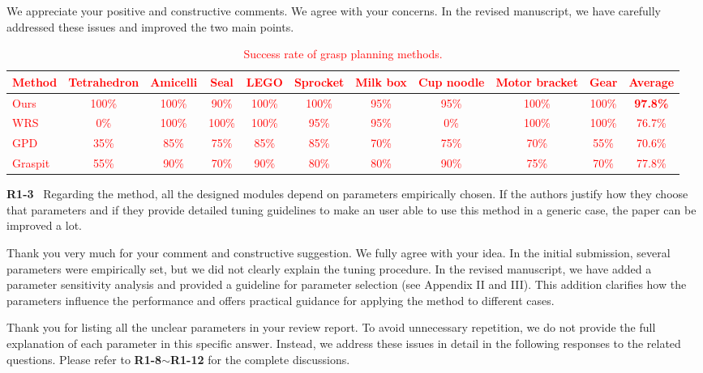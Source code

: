 \documentclass[journal]{IEEEtran}
\newcommand{\rev}[1]{\textcolor{red}{#1}}
\begin{document}
We appreciate your positive and constructive comments. We agree with your concerns. In the revised manuscript, we have carefully addressed these issues and improved the two main points. 
\\
\begin{table}[t]
    \centering
    \small
    \setlength{\tabcolsep}{4pt}
    \caption{\rev{Success rate of grasp planning methods.}}
    \rev{
    \label{tab:statistical results}
    \begin{threeparttable}
    \begin{tabular}{l|ccccccccc|c}
        \toprule
        Method & Tetrahedron & Amicelli & Seal & LEGO & Sprocket & Milk box & Cup noodle & Motor bracket & Gear &  Average \\
        \midrule
        Ours & 100\% & 100\% & 90\% & 100\% & 100\% & 95\% & 95\% & 100\% & 100\% & \textbf{97.8\%} \\
        WRS~\cite{wan2020planning} & 0\%   & 100\% & 100\% & 100\% & 95\%  & 95\% & 0\%  & 100\% & 100\% & 76.7\% \\
        GPD~\cite{ten2017grasp}& 35\%  & 85\%  & 75\%  & 85\%  & 85\%  & 70\% & 75\% & 70\%  & 55\%  & 70.6\% \\
        Graspit~\cite{miller_graspit_2021} & 55\%  & 90\%  & 70\%  & 90\%  & 80\%  & 80\% & 90\% & 75\%  & 70\%  & 77.8\% \\
        \bottomrule
    \end{tabular}
    \end{threeparttable}
    }
\end{table}

\noindent
{\textbf{\color{black}R1-3}\color{gray}~
Regarding the method, all the designed modules depend on parameters empirically chosen. If the authors justify how they choose that parameters and if they provide detailed tuning guidelines to make an user able to use this method in a generic case, the paper can be improved a lot.
}

Thank you very much for your comment and constructive suggestion. We fully agree with your idea. In the initial submission, several parameters were empirically set, but we did not clearly explain the tuning procedure. In the revised manuscript, we have added a parameter sensitivity analysis and provided a guideline for parameter selection (see Appendix II and III). This addition clarifies how the parameters influence the performance and offers practical guidance for applying the method to different cases. 

Thank you for listing all the unclear parameters in your review report. To avoid unnecessary repetition, we do not provide the full explanation of each parameter in this specific answer. Instead, we address these issues in detail in the following responses to the related questions. Please refer to \textbf{R1-8}$\sim$\textbf{R1-12} for the complete discussions.
\end{document}

